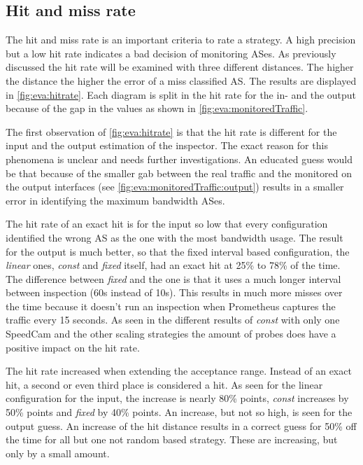 \documentclass[thesis.tex]{subfiles}
\begin{document}
\subsection{Hit and miss rate} \label{sec:eva:hitrate}
The hit and miss rate is an important criteria to rate a strategy. A high precision but a low hit rate indicates a bad decision of monitoring ASes. As previously discussed the hit rate will be examined with three different distances. The higher the distance the higher the error of a miss classified AS. The results are displayed in \autoref{fig:eva:hitrate}. Each diagram is split in the hit rate for the in- and the output because of the gap in the values as shown in \autoref{fig:eva:monitoredTraffic}.

The first observation of \autoref{fig:eva:hitrate} is that the hit rate is different for the input and the output estimation of the inspector. The exact reason for this phenomena is unclear and needs further investigations. An educated guess would be that because of the smaller gab between the real traffic and the monitored on the output interfaces (see \autoref{fig:eva:monitoredTraffic:output}) results in a smaller error in identifying the maximum bandwidth ASes.

The hit rate of an exact hit is for the input so low that every configuration identified the wrong AS as the one with the most bandwidth usage. The result for the output is much better, so that the fixed interval based configuration, the \textit{linear} ones, \textit{const} and \textit{fixed} itself, had an exact hit at 25\% to 78\% of the time. The difference between \textit{fixed} and the one is that it uses a much longer interval between inspection (60s instead of 10s). This results in much more misses over the time because it doesn't run an inspection when Prometheus captures the traffic every 15 seconds. As seen in the different results of \textit{const} with only one SpeedCam and the other scaling strategies the amount of probes does have a positive impact on the hit rate. 

The hit rate increased when extending the acceptance range. Instead of an exact hit, a second or even third place is considered a hit. As seen for the linear configuration for the input, the increase is nearly 80\% points, \textit{const} increases by 50\% points and \textit{fixed} by 40\% points. An increase, but not so high, is seen for the output guess. An increase of the hit distance results in a correct guess for 50\% off the time for all but one not random based strategy. These are increasing, but only by a small amount.
\end{document}

